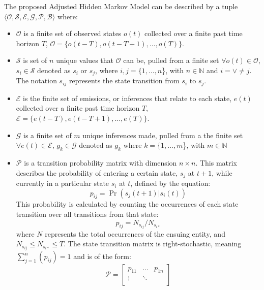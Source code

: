 \documentclass[conference]{IEEEtran}
\begin{document}
The proposed Adjusted Hidden Markov Model can be described by a tuple $\langle \mathcal{O},\mathcal{S},\mathcal{E},\mathcal{G},\mathcal{P},\mathcal{B} \rangle$  where:
\begin{itemize}
    \item $\mathcal{O}$ is a finite set of observed states $o(t)$ collected over a finite past time horizon $T$, $\mathcal{O} = \{ o(t-T), o(t-T+1), \ldots, o(T)\}$.
    \item  $\mathcal{S}$ is set of $n$ unique values that $\mathcal{O}$ can be, pulled from a finite set $\forall o(t)\in\mathcal{O}$, $s_i \in \mathcal{S}$ denoted as $s_{i}$ or $s_{j}$, where $i,j = \{1,\ldots,n$\}, with $n \in \mathbb{N}$ and $i = \lor \neq j$. The notation $s_{ij}$ represents the state transition from $s_i$ to $s_j$.
    \item $\mathcal{E}$ is the finite set of emissions, or inferences that relate to each state, $e(t)$ collected over a finite past time horizon $T$, $\mathcal{E} = \{ e(t-T), e(t-T+1), \ldots, e(T)\}$.  
    \item $\mathcal{G}$ is a finite set of $m$ unique inferences made, pulled from a the finite set $\forall e(t)\in\mathcal{E}$, $g_k \in \mathcal{G}$ denoted as $g_{k}$ where $k = \{1,\ldots,m$\}, with $m \in \mathbb{N}$
    \item $\mathcal{P}$ is a transition probability matrix with dimension $n \times n$. This matrix describes the probability of entering a certain state, $s_{j}$ at $t+1$, while currently in a particular state $s_{i}$ at $t$, defined by the equation:
        \begin{equation}
            p_{ij} = \Pr(s_j(t+1) \vert s_i(t))
        \end{equation}
        This probability is calculated by counting the occurrences of each state transition over all transitions from that state:
        \begin{equation} \label{eq:transbuild}
            p_{ij} = N_{s_{ij}}/N_{s_{i*}}
        \end{equation}
        where $N$ represents the total occurrences of the ensuing entity, and $N_{s_{ij}} \leq N_{s_{i*}} \leq T$. The state transition matrix is right-stochastic, meaning $\sum_{j=1}^{n}(p_{ij}) = 1$ and is of the form:
        \begin{equation}
            \mathcal{P} = 
                    \begin{bmatrix}
                        p_{11} & \dots & p_{1n} \\
                        \vdots & \ddots & \\

\end{bmatrix}
\end{equation}
\end{itemize}
\end{document}
